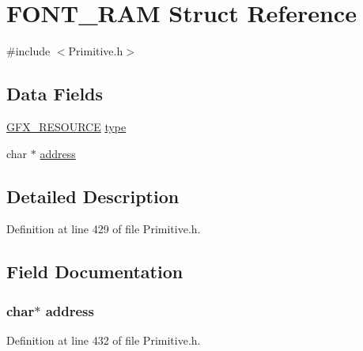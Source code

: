 \hypertarget{struct_f_o_n_t___r_a_m}{}\section{F\+O\+N\+T\+\_\+\+R\+A\+M Struct Reference}
\label{struct_f_o_n_t___r_a_m}


{\ttfamily \#include $<$Primitive.\+h$>$}

\subsection*{Data Fields}
\begin{DoxyCompactItemize}
\item 
\hyperlink{_primitive_8h_a9a3785e6345a6e01071a873d03698baf}{G\+F\+X\+\_\+\+R\+E\+S\+O\+U\+R\+C\+E} \hyperlink{struct_f_o_n_t___r_a_m_ad19c8e0d19c638be9dd81d163454b0f1}{type}
\item 
char $\ast$ \hyperlink{struct_f_o_n_t___r_a_m_a879a8cdf605d02f8af8b2e216b8764f2}{address}
\end{DoxyCompactItemize}


\subsection{Detailed Description}


Definition at line 429 of file Primitive.\+h.



\subsection{Field Documentation}
\hypertarget{struct_f_o_n_t___r_a_m_a879a8cdf605d02f8af8b2e216b8764f2}{}
\subsubsection[{address}]{\setlength{\rightskip}{0pt plus 5cm}char$\ast$ address}\label{struct_f_o_n_t___r_a_m_a879a8cdf605d02f8af8b2e216b8764f2}


Definition at line 432 of file Primitive.\+h.

\hypertarget{struct_f_o_n_t___r_a_m_ad19c8e0d19c638be9dd81d163454b0f1}{}
